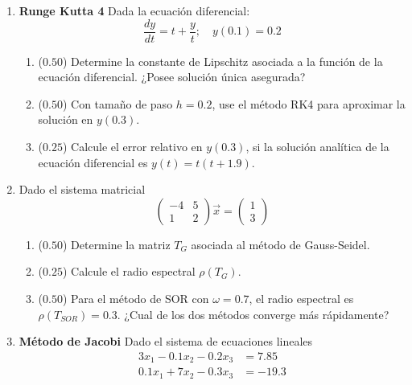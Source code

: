 \documentclass[12pt]{article}
\begin{document}
  \begin{enumerate}[leftmargin=*,widest=9]
    \item \textbf{Runge Kutta 4} Dada la ecuación diferencial:
    \[
    \frac{dy}{dt} = t + \frac{y}{t}; \quad y(0.1)=0.2
    \]
    \begin{enumerate}[label=\alph*]
    \item ($0.50$) Determine la constante de Lipschitz asociada a la función de la ecuación diferencial. ¿Posee solución única asegurada?
    \vspace{2cm}
    \item ($0.50$) Con tamaño de paso \(h=0.2\), use el método RK4 para aproximar la solución en \(y(0.3)\).
    \vspace{3cm}
    \item ($0.25$) Calcule el error relativo en \(y(0.3)\), si la solución analítica de la ecuación diferencial es \(y(t) = t(t+1.9)\).
    \vspace{2cm}
    \end{enumerate}
    \item Dado el sistema matricial
    \[
    \begin{pmatrix}
    -4 & 5 \\ 1 & 2
    \end{pmatrix} \vec{x} = \begin{pmatrix}
    1 \\ 3
    \end{pmatrix}
    \]
    \begin{enumerate}[label=\alph*]
    \item ($0.50$) Determine la matriz \(T_G\) asociada al método de Gauss-Seidel.
    \vspace{2cm}
    \item ($0.25$) Calcule el radio espectral \(\rho(T_G)\).
    \vspace{2cm}
    \item ($0.50$) Para el método de SOR con \(\omega=0.7\), el radio espectral es \(\rho(T_{SOR}) = 0.3\). ¿Cual de los dos métodos converge más rápidamente?
    \vspace{1cm}
    \end{enumerate}
    \item \textbf{Método de Jacobi} Dado el sistema de ecuaciones lineales
    \begin{align*}
    3x_1 - 0.1x_2 - 0.2x_3 & = 7.85 \\
    0.1x_1 + 7x_2 - 0.3x_3 & = -19.3 \\

\end{align*}
\end{enumerate}
\end{document}
